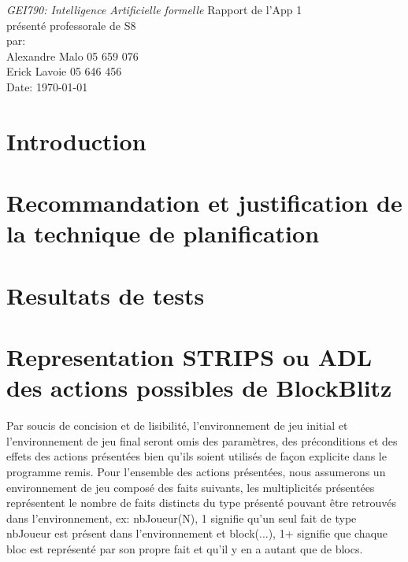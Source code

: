 \documentclass[12pt,english,frenchb,letterpaper]{article}
\begin{document}
\thispagestyle{empty}
\begin{center}
{\large\em GEI790:  Intelligence Artificielle formelle}
\vfill
Rapport de l'App 1\\
présenté professorale de S8\\
\vfill
par:\\
Alexandre Malo\hspace{2cm} 05 659 076\\
Erick Lavoie\hspace{2cm} 05 646 456\\
\vfill
Date: \today
\end{center}

\newpage
\onehalfspacing


\tableofcontents

\newpage


\section{Introduction}

\section{Recommandation et justification de la technique de planification}

\section{Resultats de tests}



\section{Representation STRIPS ou ADL des actions possibles de BlockBlitz}
Par soucis de concision et de lisibilité, l'environnement de jeu initial et l'environnement de jeu final seront omis des paramètres, des préconditions et des effets des actions présentées bien qu'ils soient utilisés de fa\c con explicite dans le programme remis.  Pour l'ensemble des actions présentées, nous assumerons un environnement de jeu composé des faits suivants, les multiplicités présentées représentent le nombre de faits distincts du type présenté pouvant être retrouvés dans l'environnement, ex: nbJoueur(N), 1 signifie qu'un seul fait de type nbJoueur est présent dans l'environnement et block(...), 1+ signifie que chaque bloc est représenté par son propre fait et qu'il y en a autant que de blocs.
\end{document}
